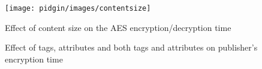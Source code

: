\documentclass[epsfig,a4paper,11pt,titlepage]{book}
\numberwithin{algorithm}{chapter}
\begin{document}
\begin{figure} [htp]
\centering
\texttt{[image: pidgin/images/contentsize]} \caption[Effect of content size on the AES encryption/decryption time]{Effect of content size on the \gls{AES} encryption/decryption time}
\label{gra:contentsize}
\end{figure}


\begin{figure}
\centering


\caption[Effect of tags and attributes on publisher's encryption time]{Effect of  tags,  attributes and  both tags and attributes on publisher's encryption time}
\label{fig:pidgin-pub-enc}
\end{figure}

\iffalse
Tag = 51.78
Trapdoor = 28.47
Match = 13.28
\fi
\end{document}
